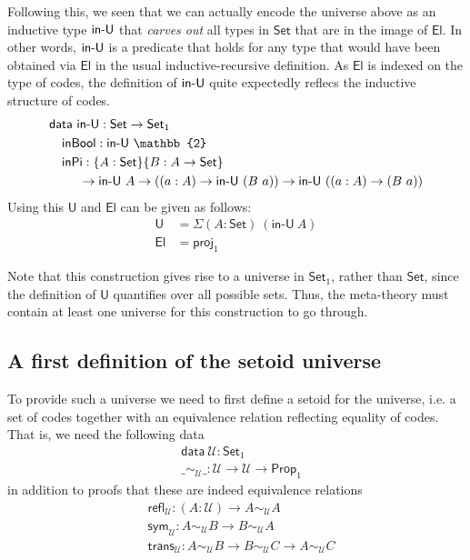 \documentclass{easychair}
\newcommand{\setoidU}{\mathcal{U}}
\newcommand{\ad}[1]{\AgdaFunction{#1}}
\newcommand{\Set}{\textsf{Set}}
\newcommand{\Prop}{\textsf{Prop}}
\newcommand{\U}{\textsf{U}}
\newcommand{\El}{\textsf{El}}
\newcommand{\equ}[2]{#1 \sim_\setoidU #2}
\providecommand\mathbbm{\mathbb}
\begin{document}
Following this, we seen that we can actually encode the universe above as an
inductive type $\ad{in-U}$ that \emph{carves out} all types in $\Set$ that are
in the image of $\El$. In other words, $\ad{in-U}$ is a predicate that holds for
any type that would have been obtained via $\El$ in the usual
inductive-recursive definition. As $\El$ is indexed on the type of codes, the
definition of $\ad{in-U}$ quite expectedly reflecs the inductive structure of
codes.
%
\begin{align*}
  & \textsf{data}\ \ad{in-U} : \Set \to \Set_1 \\
  & \quad \textsf{inBool} : \textsf{in-U}\ \mathbbm{2} \\
  & \quad \textsf{inPi}
  :  \{A : \Set\} \{B : A \to \Set\}\\
  & \ \qquad \to \ad{in-U}\ A
  \to ((a : A) \to \ad{in-U}\ (B\ a))
  \to \ad{in-U}\ ((a : A) \to (B\ a))
\end{align*}
Using this $\U$ and $\El$ can be given as follows:
\begin{align*}
  \U & = \Sigma (A : \Set)\ (\textsf{in-U}\ A) \\
  \El & = \textsf{proj}_1
\end{align*}

Note that this construction gives rise to a universe in $\Set_1$, rather than
$\Set$, since the definition of $\U$ quantifies over all possible sets. Thus,
the meta-theory must contain at least one universe for this construction to go
through.

\subsection{A first definition of the setoid universe}

To provide such a universe we need to first define a setoid for the universe,
i.e. a set of codes together with an equivalence relation reflecting equality of
codes. That is, we need the following data
%
\begin{align*}
  & \textsf{data} \ \setoidU : \Set_1 \\
  & \_\sim_\setoidU\_ : \setoidU \to \setoidU \to \Prop_1
\end{align*}
%
in addition to proofs that these are indeed equivalence relations
%
\begin{align*}
  & \textsf{refl}_\setoidU : (A : \setoidU) \to \equ{A}{A} \\
  & \textsf{sym}_\setoidU : \equ{A}{B} \to \equ{B}{A} \\
  & \textsf{trans}_\setoidU : \equ{A}{B} \to \equ{B}{C} \to \equ{A}{C}
\end{align*}
\end{document}
